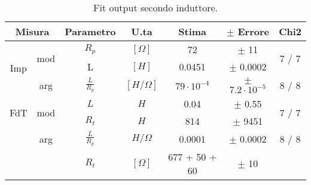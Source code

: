 \begin{table}[H]
\begin{center}
\begin{tabular}{|c|c|c|c|c|c|c|}
\hline

\multicolumn{2}{|c|}{Misura}  & Parametro   & U.ta & Stima & $\pm$ Errore & Chi2     \\ \hline

\multirow{ 3}{*}{Imp}

& \multirow{ 2}{*}{mod} & $R_{p}$ &  $[\Omega]$    
&  72 & $\pm$    11 & \multirow{ 2}{*}{ 7 / 7 } \\ 

&  & L  & $[H]$     
&   0.0451 & $\pm$    0.0002 &  \\

& arg & $ \tfrac{L}{R_{p}} $ & $[H / \Omega]$
& $79\cdot 10^{-4}$ & $\pm$ $7.2\cdot 10^{-5}$ &  8 / 8 \\ \hline


\multirow{ 2}{*}{FdT}
& \multirow{ 2}{*}{mod} 

& $L$ & $ H $     
& 0.04  & $\pm$ 0.55     & \multirow{ 2}{*}{ 7 / 7 } \\

&
& $R_{t}$ & $ H $ 
& 814     & $\pm$ 9451 &  \\ 

& arg & $ \tfrac{L}{R_{p}} $ & $ H / \Omega $ 
& 0.0001  & $\pm$  0.0002 &   8 / 8  \\ \hline

\multicolumn{2}{|c|}{}  & $R_{t}$ & $[\Omega]$  
& 677 + 50 + 60  & $\pm$  10 &      \\ \hline

\end{tabular}

\label{C3_P1_fit_cond1}

\caption{
Fit output secondo induttore.
}

\end{center}

\end{table}
